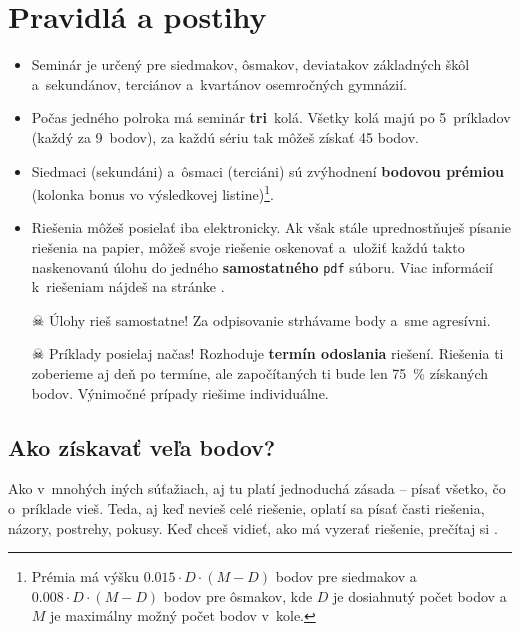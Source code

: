 \pagestyle{rules}

\section{Pravidlá a postihy}
\begin{itemize}
    \item Seminár je určený pre siedmakov, ôsmakov, deviatakov základných škôl a~sekundánov, terciánov a~kvartánov osemročných gymnázií. 

    \item Počas jedného polroka má seminár \textbf{tri}~kolá. Všetky kolá majú po 5~príkladov (každý za 9~bodov), za každú sériu tak môžeš získať 45 bodov.

    \item Siedmaci (sekundáni) a~ôsmaci (terciáni) sú zvýhodnení \textbf{bodovou prémiou} (kolonka bonus vo výsledkovej
        listine)\footnote{Prémia má výšku $\num{0.015} \cdot D \cdot (M - D)$ bodov pre siedmakov a $\num{0.008} \cdot D \cdot (M - D)$ bodov pre ôsmakov,
        kde $D$ je dosiahnutý počet bodov a $M$ je maximálny možný počet bodov v~kole.}.

    \item Riešenia môžeš posielať iba elektronicky. Ak však stále uprednostňuješ písanie riešenia na papier,
        môžeš svoje riešenie oskenovať a~uložiť každú takto naskenovanú úlohu do jedného \textbf{samostatného} \texttt{pdf} súboru.
        Viac informácií k~riešeniam nájdeš na stránke .

    \item[$\skull$] Úlohy rieš samostatne! Za odpisovanie strhávame body a~sme agresívni. 

    \item[$\skull$] Príklady posielaj načas! Rozhoduje \textbf{termín odoslania} riešení. Riešenia ti zoberieme
        aj deň po termíne, ale započítaných ti bude len \SI{75}{\percent} získaných bodov. Výnimočné prípady riešime individuálne.
\end{itemize}

\subsection{Ako získavať veľa bodov?}
    Ako v~mnohých iných súťažiach, aj tu platí jednoduchá zásada -- písať všetko, čo o~príklade vieš. Teda, aj keď nevieš celé riešenie, oplatí sa písať časti
    riešenia, názory, postrehy, pokusy. Keď chceš vidieť, ako má vyzerať riešenie, prečítaj si . 

